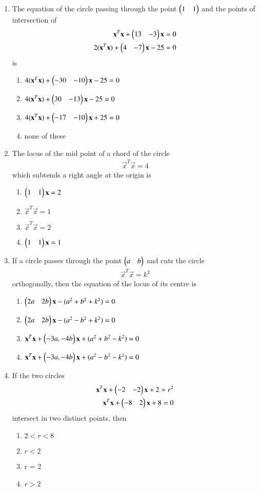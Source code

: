 \begin{enumerate}[label=\arabic*.,ref=\thesubsection.\theenumi]
\item The equation of the circle passing through the point $\begin{pmatrix}1 & 1\end{pmatrix}$ and the points of intersection of 
\begin{align} 
\mathbf{x}^T\mathbf{x} + \begin{pmatrix}13 & -3\end{pmatrix}\mathbf{x} = 0 \\
2(\mathbf{x}^T\mathbf{x}) + \begin{pmatrix}4 & -7\end{pmatrix}\mathbf{x} - 25 = 0
\end{align} 
is 
\begin{enumerate}
\item $4(\mathbf x^T\mathbf x) + \begin{pmatrix}-30 & -10\end{pmatrix}\mathbf{x} - 25 = 0$
\item $4(\mathbf x^T\mathbf x) + \begin{pmatrix}30 & -13\end{pmatrix}\mathbf{x} - 25 = 0$
\item $4(\mathbf x^T\mathbf x) + \begin{pmatrix}-17 & -10\end{pmatrix}\mathbf{x} + 25 = 0$
\item none of these
\end{enumerate}

\item The locus of the mid point of a chord of the circle
\begin{align}
\vec{x}^T\vec{x} = 4
\end{align} 
which subtends a right angle at the origin is
\begin{enumerate}
\item $\begin{pmatrix}1 & 1\end{pmatrix}\mathbf{x} = 2$
\item $\vec{x}^T\vec{x} = 1$
\item $\vec{x}^T\vec{x} = 2$
\item $\begin{pmatrix}1 & 1\end{pmatrix}\mathbf{x} = 1$
\end{enumerate}

\item If a circle passes through the point $\begin{pmatrix}a & b\end{pmatrix}$ and cuts the circle 
\begin{align}
\vec{x}^T\vec{x} = k^{2}
\end{align} 
orthogonally, then the equation of the locus of its centre is  
\begin{enumerate}
\item $\begin{pmatrix}2a & 2b\end{pmatrix}\mathbf{x} - (a^2 + b^2 + k^2) = 0$
\item $\begin{pmatrix}2a & 2b\end{pmatrix}\mathbf{x} - (a^2 - b^2 + k^2) = 0$
\item $\mathbf{x}^T\mathbf{x} + \begin{pmatrix}-3a, -4b\end{pmatrix}\mathbf{x} + (a^2 + b^2 - k^2) = 0$
\item $\mathbf{x}^T\mathbf{x} + \begin{pmatrix}-3a, -4b\end{pmatrix}\mathbf{x} + (a^2 - b^2 - k^2) = 0$
\end{enumerate}

\item If the two circles 
\begin{align}
\mathbf{x}^T\mathbf{x} + \begin{pmatrix}-2 &-2\end{pmatrix}\mathbf{x} + 2 = r^{2} \\
\mathbf{x}^T\mathbf{x} + \begin{pmatrix}-8 & 2\end{pmatrix}\mathbf{x} + 8 = 0
\end{align} 
intersect in two distinct points, then
\begin{enumerate}
\item $2 < r < 8$
\item $r < 2$
\item r = 2
\item $r > 2$
\end{enumerate}


\end{enumerate}
